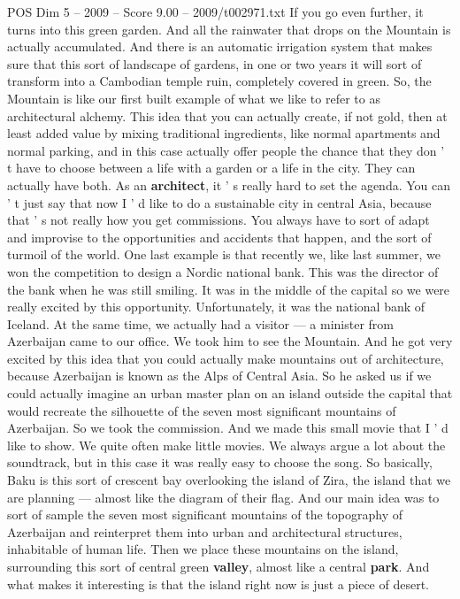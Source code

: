 \begin{textsample}{POS Dim 5 – 2009 – Score 9.00 – 2009/t002971.txt}
If you go even further, it turns into this green garden.
And all the rainwater that drops on the Mountain is actually accumulated.
And there is an automatic irrigation system that makes sure that this sort of landscape of gardens, in one or two years it will sort of transform into a Cambodian temple ruin, completely covered in green.
So, the Mountain is like our first built example of what we like to refer to as architectural alchemy.
This idea that you can actually create, if not gold, then at least added value by mixing traditional ingredients, like normal apartments and normal parking, and in this case actually offer people the chance that they don ' t have to choose between a life with a garden or a life in the city.
They can actually have both.
As an \textbf{architect}, it ' s really hard to set the agenda.
You can ' t just say that now I ' d like to do a sustainable city in central Asia, because that ' s not really how you get commissions.
You always have to sort of adapt and improvise to the opportunities and accidents that happen, and the sort of turmoil of the world.
One last example is that recently we, like last summer, we won the competition to design a Nordic national bank.
This was the director of the bank when he was still smiling.
It was in the middle of the capital so we were really excited by this opportunity.
Unfortunately, it was the national bank of Iceland.
At the same time, we actually had a visitor — a minister from Azerbaijan came to our office.
We took him to see the Mountain.
And he got very excited by this idea that you could actually make mountains out of architecture, because Azerbaijan is known as the Alps of Central Asia.
So he asked us if we could actually imagine an urban master plan on an island outside the capital that would recreate the silhouette of the seven most significant mountains of Azerbaijan.
So we took the commission.
And we made this small movie that I ' d like to show.
We quite often make little movies.
We always argue a lot about the soundtrack, but in this case it was really easy to choose the song.
So basically, Baku is this sort of crescent bay overlooking the island of Zira, the island that we are planning — almost like the diagram of their flag.
And our main idea was to sort of sample the seven most significant mountains of the topography of Azerbaijan and reinterpret them into urban and architectural structures, inhabitable of human life.
Then we place these mountains on the island, surrounding this sort of central green \textbf{valley}, almost like a central \textbf{park}.
And what makes it interesting is that the island right now is just a piece of desert.

\end{textsample}
